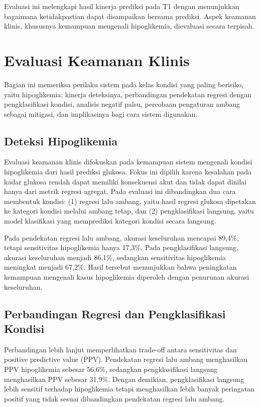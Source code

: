 Evaluasi ini melengkapi hasil kinerja prediksi pada T1 dengan menunjukkan bagaimana ketidakpastian dapat disampaikan bersama prediksi. Aspek keamanan klinis,
khususnya kemampuan mengenali hipoglikemia, dievaluasi secara terpisah.

\section{Evaluasi Keamanan Klinis}
\label{sec:bab6-evaluasi-keamanan-klinis}

Bagian ini memeriksa perilaku sistem pada kelas kondisi yang paling berisiko, yaitu hipoglikemia: kinerja deteksinya, perbandingan pendekatan regresi dengan
pengklasifikasi kondisi, analisis negatif palsu, percobaan pengaturan ambang sebagai mitigasi, dan implikasinya bagi cara sistem digunakan.

\subsection{Deteksi Hipoglikemia}
\label{subsec:bab6-deteksi-hipoglikemia}

Evaluasi keamanan klinis difokuskan pada kemampuan sistem mengenali kondisi hipoglikemia dari hasil prediksi glukosa. Fokus ini dipilih karena kesalahan pada kadar
glukosa rendah dapat memiliki konsekuensi akut dan tidak dapat dinilai hanya dari metrik regresi agregat. Pada evaluasi ini dibandingkan dua cara membentuk kondisi: (1) regresi lalu ambang, yaitu hasil regresi glukosa dipetakan ke kategori kondisi
melalui ambang tetap, dan (2) pengklasifikasi langsung, yaitu model klasifikasi yang memprediksi kategori kondisi secara langsung.



Pada pendekatan regresi lalu ambang, akurasi keseluruhan mencapai 89,4\%, tetapi sensitivitas hipoglikemia hanya 17,3\%. Pada pengklasifikasi langsung,
akurasi keseluruhan menjadi 86,1\%, sedangkan sensitivitas hipoglikemia meningkat menjadi 67,2\%. Hasil tersebut menunjukkan bahwa peningkatan kemampuan
mengenali kasus hipoglikemia diperoleh dengan penurunan akurasi keseluruhan.

\subsection{Perbandingan Regresi dan Pengklasifikasi Kondisi}
\label{subsec:bab6-perbandingan-regresi-classifier}

Perbandingan lebih lanjut memperlihatkan trade-off antara sensitivitas dan positive predictive value (PPV). Pendekatan regresi lalu ambang menghasilkan
PPV hipoglikemia sebesar 56,6\%, sedangkan pengklasifikasi langsung menghasilkan PPV sebesar 31,9\%. Dengan demikian, pengklasifikasi langsung lebih
sensitif terhadap hipoglikemia tetapi menghasilkan lebih banyak peringatan positif yang tidak sesuai dibandingkan pendekatan regresi lalu ambang.

